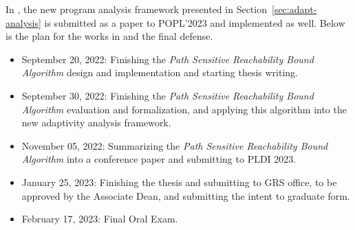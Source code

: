 In , the new program analysis framework presented in Section~\ref{sec:adapt-analysis}
 is submitted as a paper to POPL'2023 and implemented as well. 
 Below is the plan for
 the works in  and the final defense.
\begin{itemize}
\item September 20, 2022:
Finishing the \emph{Path Sensitive Reachability Bound Algorithm} design and implementation and starting thesis writing.
\item September 30, 2022: Finishing the \emph{Path Sensitive Reachability Bound Algorithm} evaluation and formalization, 
and applying this algorithm into the new adaptivity analysis framework.
\item November 05, 2022: Summarizing the \emph{Path Sensitive Reachability Bound Algorithm} into a conference paper and submitting to PLDI 2023.
\item January 25, 2023: Finishing the thesis and submitting to GRS office, to be approved by the Associate Dean, and submitting the intent to graduate form.
\item February 17, 2023: Final Oral Exam. 
\end{itemize}

